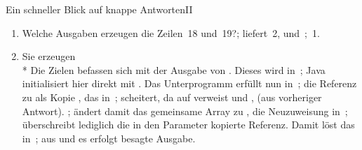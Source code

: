 {{\begin{frame}{Ein schneller Blick auf knappe Antworten\hfill II}
\begin{enumerate}[<+(1)->]
    \itemsep10pt
    \item {\intask Welche Ausgaben erzeugen die Zeilen~18 und~19?}\hfill{}; liefert~2, und~;~1.
    \item {}\par
    \pause Sie erzeugen  \smallskip\\*
    \pause Die Zielen befassen sich mit der Ausgabe von . Dieses wird in~; Java initialisiert hier direkt mit . \pause Das Unterprogramm erfüllt nun in~; die Referenz zu  als Kopie , \pause das  in~; scheitert, da  auf   verweist und ,  (aus vorheriger Antwort). \pause
   ; ändert damit das gemeinsame Array zu  , die Neuzuweisung in~; überschreibt lediglich die in den Parameter kopierte Referenz. \pause
    Damit löst das  in~; aus und es erfolgt besagte Ausgabe.
\end{enumerate}
\end{frame}
}
}
\iffull
